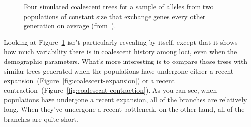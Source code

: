 \begin{figure}
\begin{center}
\end{center}
\caption{Four simulated coalescent trees for a sample of alleles from
  two populations of constant size that exchange genes every other
  generation on average (from~\cite{Harpending-etal-1998}).}\label{fig:coalescent-constant}
\end{figure}

Looking at Figure~\ref{fig:coalescent-constant} isn't particularly
revealing by itself, except that it shows how much variability there
is in coalescent history among loci, even when the demographic
parameters. What's more interesting is to compare those trees with
similar trees generated when the populations have undergone either a
recent expansion~(Figure~\ref{fig:coalescent-expansion}) or a recent
contraction~(Figure~\ref{fig:coalescent-contraction}). As you can see,
when populations have undergone a recent expansion, all of the
branches are relatively long. When they've undergone a recent
bottleneck, on the other hand, all of the branches are quite
short.


